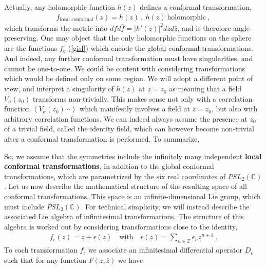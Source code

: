 \documentclass[12pt,a4paper,notitlepage]{report}
\newcommand \la {\left\langle}
\newcommand \ra {\right\rangle}
\newcommand \Z {\mathbb{Z}}
\newcommand \C {\mathbb{C}}
\numberwithin{equation}{section}
\theoremstyle{break}
\begin{document}
Actually, any holomorphic function $h(z)$ defines a conformal transformation,
\begin{align}
 f_\text{local conformal}(z) = h(z) \ , \ h(z)\ \text{holomorphic}\ , 
\label{flc}
\end{align}
which transforms the metric into $dfd\bar{f} = |h'(z)|^2 dzd\bar{z}$, and is therefore angle-preserving. One may object that the only holomorphic functions on the sphere are the functions $f_g$ (\ref{gisl}) which encode the global conformal transformations. And indeed, any further conformal transformation must have singularities, and cannot be one-to-one. We could be content with considering transformations which would be defined only on some region. We will adopt a different point of view, and interpret a singularity of $h(z)$ at $z=z_0$ as meaning that a field $V_\sigma(z_0)$ transforms non-trivially. This makes sense not only with a correlation function $\la V_{\sigma}(z_0)\cdots \ra $ which manifestly involves a field at $z=z_0$, 
but also with arbitrary correlation functions.
We can indeed always assume the presence at $z_0$ of a trivial field, called the identity field, which can however become non-trivial after a conformal transformation is performed. To summarize,
\begin{center}
\end{center}
So, we assume that the symmetries include the infinitely many independent \textbf{\boldmath local conformal transformations}, in addition to the global conformal transformations, which are parametrized by the six real coordinates of $PSL_2(\C)$. Let us now describe the mathematical structure of the resulting space of all conformal transformations. This space is an infinite-dimensional Lie group, which must include $PSL_2(\C)$. For technical simplicity, we will instead describe the associated Lie algebra of infinitesimal transformations. The structure of this algebra is worked out by considering transformations close to the identity, 
\begin{align}
 f_{\epsilon}(z) = z + \epsilon(z) \quad \text{with} \quad \epsilon(z) = \sum_{n\in\Z} \epsilon_n z^{n+1}\ .
\label{sen}
\end{align}
To each transformation $f_\epsilon$ we associate an infinitesimal differential operator $D_\epsilon$ such that for any function $F(z,\bar{z})$ we have 
\end{document}

